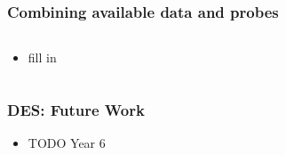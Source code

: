 \documentclass{beamer}
\begin{document}
\frame
{
    \frametitle{Combining available data and probes}


    \begin{columns}
        \begin{column}{0.5\textwidth}    
            \begin{itemize}

                \item fill in

            \end{itemize}
        \end{column}
        \begin{column}{0.5\textwidth}
        \end{column}
    \end{columns}

}


\frame
{
    \frametitle{DES: Future Work}

 
    \begin{itemize}

        \item TODO Year 6

    \end{itemize}

}
\end{document}
